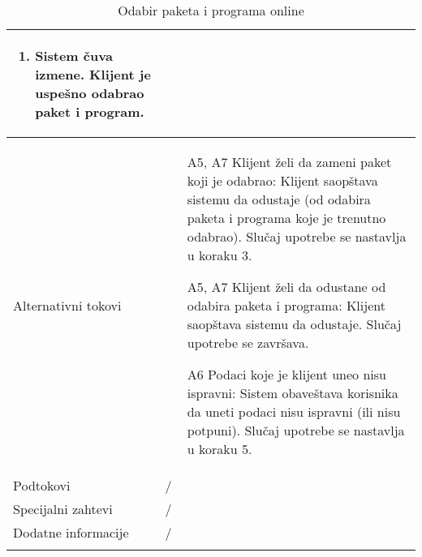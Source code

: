 \documentclass[../main.tex]{subfiles}
\begin{document}
\begin{longtable}{| p{} | p{} |}
\begin{enumerate}
        \item Sistem čuva izmene. Klijent je uspešno odabrao paket i program.
    \end{enumerate}\\
\hline
    Alternativni tokovi & \begin{itemize}
        \item[A5, A7] Klijent želi da zameni paket koji je odabrao: Klijent saopštava sistemu da odustaje (od odabira paketa i programa koje je trenutno odabrao). Slučaj upotrebe se nastavlja u koraku 3.
        \item [A5, A7] Klijent želi da odustane od odabira paketa i programa: Klijent saopštava sistemu da odustaje. Slučaj upotrebe se završava.
        \item [A6] Podaci koje je klijent uneo nisu ispravni: Sistem obaveštava korisnika da uneti podaci nisu ispravni (ili nisu potpuni). Slučaj upotrebe se nastavlja u koraku 5.
    \end{itemize}\\
\hline
    Podtokovi & /\\
\hline
    Specijalni zahtevi & /\\
\hline
    Dodatne informacije & /\\
\hline
\caption{Odabir paketa i programa online} %
\end{longtable}
\end{document}
